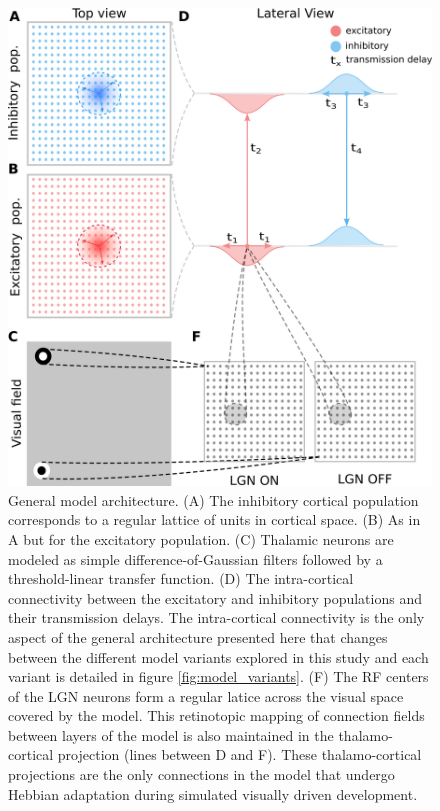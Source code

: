 \documentclass[utf8]{frontiersSCNS}
\begin{document}
\begin{figure}[htpb!] 
\centering
\includegraphics[width=16cm]{./SVG/FigureModelArchitecture/drawing.png}
\caption{General model architecture. (A) The inhibitory cortical population corresponds to a regular lattice of units in cortical space. (B) As in A but 
for the excitatory population. (C) Thalamic neurons are modeled as simple difference-of-Gaussian filters followed by a threshold-linear transfer function. 
(D) The intra-cortical connectivity between the excitatory and inhibitory populations and their transmission delays. The intra-cortical connectivity is the only aspect of the general architecture presented here that changes between the different model variants explored in this study and each variant is detailed in figure \ref{fig:model_variants}.
(F) The RF centers of the LGN neurons form a regular latice across the visual space covered by the model. This retinotopic mapping of connection fields between layers of the model is also maintained in the thalamo-cortical projection (lines between D and F). These thalamo-cortical projections are the only connections in the model that undergo Hebbian adaptation during simulated visually driven development.}
\label{fig:model_architecture}
\end{figure} 
\end{document}
